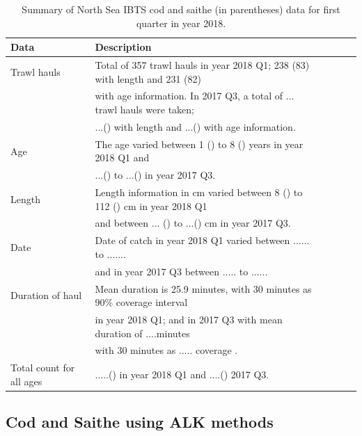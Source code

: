 \documentclass[a4paper 12pt]{article}
\numberwithin{equation}{section}
\begin{document}
\begin{small}
\begin{table}[h!]
\caption{Summary of North Sea IBTS cod and saithe (in parentheses) data for first quarter in year 2018.}
\begin{tabular}{llllll}
\toprule
\bf Data&\bf Description \\
\midrule
Trawl hauls  & Total of 357 trawl hauls in year 2018 Q1; 238 (83)  with length and 231 (82) \\ & with age information. In 2017 Q3, a total of ... trawl hauls were taken; \\ & ...() with length and ...() with age information. \\[1.7ex]

Age &The age varied between 1 () to 8 () years in year 2018 Q1 and \\ & ...() to ...() in year 2017 Q3. \\[1.7ex]

Length & Length information in cm varied between 8 () to 112 () cm in year 2018 Q1 \\ & and between ... () to ...() cm in year 2017 Q3. \\[1.7ex]

Date&Date of catch in year 2018 Q1 varied between ...... to ....... \\ & and in year 2017 Q3 between ..... to ...... \\[1.7ex]

Duration of haul & Mean duration is 25.9 minutes, with 30 minutes as 90\% coverage interval \\ & in year 2018 Q1; and in 2017 Q3 with mean duration of ....minutes \\ & with 30 minutes as ..... coverage . \\[1.7ex]

Total count for all ages & .....() in year 2018 Q1 and ....() 2017 Q3. \\[0.5ex]
\bottomrule
\end{tabular}
\label{tab:data2018}
\end{table}
\end{small}




\subsection{Cod and Saithe using ALK methods}
\label{sec:codresults}
\end{document}
